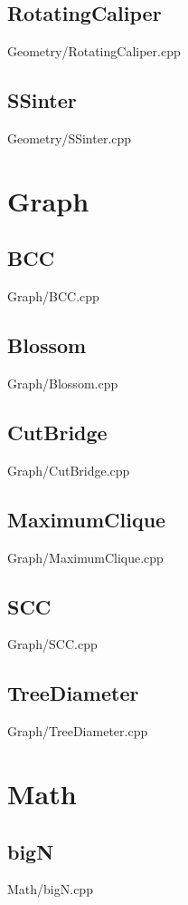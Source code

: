     \subsection{RotatingCaliper}
         {Geometry/RotatingCaliper.cpp}
    \subsection{SSinter}
         {Geometry/SSinter.cpp}

\section{Graph}
    \subsection{BCC}
         {Graph/BCC.cpp}
    \subsection{Blossom}
         {Graph/Blossom.cpp}
    \subsection{CutBridge}
         {Graph/CutBridge.cpp}
    \subsection{MaximumClique}
         {Graph/MaximumClique.cpp}
    \subsection{SCC}
         {Graph/SCC.cpp}
    \subsection{TreeDiameter}
         {Graph/TreeDiameter.cpp}

\section{Math}
    \subsection{bigN}
         {Math/bigN.cpp}
